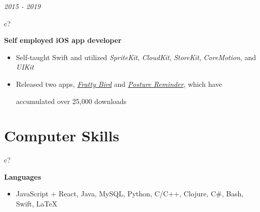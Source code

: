 \documentclass[12pt,a4paper,sans]{moderncv} %
\begin{document}
 
 \textit{2015 - 2019}
\hspace{1 mm}
\begin{tabular}{c?}
 \\
\end{tabular}
 \hspace{1 mm}
 \textbf{Self employed iOS app developer} 
 
 \begin{itemize}
 \addtolength{\itemindent}{31.7 mm}
    \item Self-taught Swift and utilized \textit{SpriteKit}, \textit{CloudKit}, \textit{StoreKit}, \textit{CoreMotion}, and \textit{UIKit}
 \item Released two apps, \href{https://itunes.apple.com/us/app/fratty-bird-the-game/id1143642394?mt=8}{\textit{Fratty Bird}} and \href{https://itunes.apple.com/us/app/posture-reminder/id1280214465?mt=8}{\textit{Posture Reminder}}, which have 
 
   \hspace{30.5 mm}  accumulated over 25,000 downloads
   
 \end{itemize}
 
\begin{comment}
Rank yourself on proficiency in each. I broke mine down into "Advanced Knowledge", "Working Proficiency", and "Limited Exposure"
\end{comment}

\vspace{-4 mm}
\section{Computer Skills}


 \hspace{24.5 mm}
\begin{tabular}{c?}
 \\
\end{tabular}
 \hspace{2 mm}
 \textbf{Languages}
 
\begin{itemize}
\addtolength{\itemindent}{31.7 mm}
\item{JavaScript + React, Java, MySQL, Python, C/C++, Clojure, C\#, Bash, Swift, \LaTeX}
\end{itemize}
\end{document}
